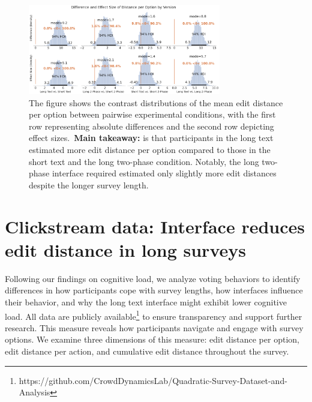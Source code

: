 \begin{figure}[t!]
    \centering
    \includegraphics[width=0.75\textwidth]{content/image/distance/distance_diff_per_option_effect_size_by_version.pdf}
    \caption{The figure shows the contrast distributions of the mean edit distance per option between pairwise experimental conditions, with the first row representing absolute differences and the second row depicting effect sizes.~\textbf{Main takeaway:} is that participants in the long text estimated more edit distance per option compared to those in the short text and the long two-phase condition. Notably, the long two-phase interface required estimated only slightly more edit distances despite the longer survey length.}
    \label{fig:dist_per_option_bayesian}
\end{figure}

\section{Clickstream data: Interface reduces edit distance in long surveys}
\label{sec:dist}
Following our findings on cognitive load, we analyze voting behaviors to identify differences in how participants cope with survey lengths, how interfaces influence their behavior, and why the long text interface might exhibit lower cognitive load. All data are publicly available\footnote{https://github.com/CrowdDynamicsLab/Quadratic-Survey-Dataset-and-Analysis} to ensure transparency and support further research. This measure reveals how participants navigate and engage with survey options. We examine three dimensions of this measure: edit distance per option, edit distance per action, and cumulative edit distance throughout the survey.

